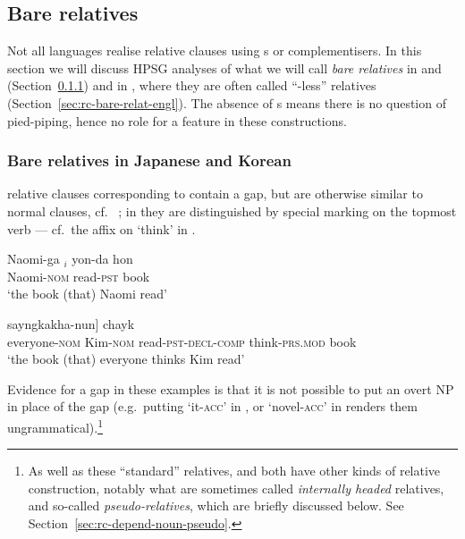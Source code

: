 \documentclass[output=paper
 	        ,biblatex
                ,babelshorthands
                ,newtxmath
                ,draftmode
                ,colorlinks, citecolor=brown
]{langscibook}
\begin{document}
\subsection{Bare relatives}
\label{sec:rc-bare-relatives}

Not all languages realise relative clauses using s or complementisers. In this section we
will discuss HPSG analyses of what we will call \emph{bare relatives} in  and 
(Section~\ref{sec:rc-bare-relat-japan}) and in , where they are often called
``-less'' relatives (Section~\ref{sec:rc-bare-relat-engl}).  The absence of s means there is no question of pied-piping, hence no role for a 
feature in these constructions.

\subsubsection{Bare relatives in Japanese and Korean}
\label{sec:rc-bare-relat-japan}

relative clauses corresponding to  contain a gap, but are otherwise similar to
normal clauses, cf.\  \citep[from][18]{SiraiGunjiRelative}; in  they are
distinguished by special marking on the topmost verb --- cf.\ the  affix on
 `think' in 
\citep[from][285]{Kim16SyntacticStrKorean}.
\begin{exe}\ex\label{x:rc-81}
\gll Naomi-ga \trace{}$_i$ yon-da hon\\
     Naomi-\textsc{nom} {} read-\textsc{pst} book\\
\glt `the book (that) Naomi read'
\end{exe}
\begin{exe}\ex\label{x:rc-82}
\gll [motwu-ka           [Kim-i       \trace{}\subscr{i} ilk-ess-ta-ko]  sayngkakha-nun] chayk \\
      \hphantom{[}everyone-\textsc{nom} \hphantom{[}Kim-\textsc{nom}  {}     read-\textsc{pst-decl-comp} think-\textsc{prs.mod}   book\\
\glt `the book (that) everyone thinks Kim read'  
\end{exe}
Evidence for a gap in these examples is that it is not possible to put an overt NP in
place of the gap (e.g.\ putting  `it-\textsc{acc}' in , or
 `novel-\textsc{acc}' in  renders them ungrammatical).\footnote{As
  well as these ``standard'' relatives,  and  both have other kinds of
  relative construction, notably what are sometimes called \emph{internally headed} relatives, and so-called
  \emph{pseudo-relatives}, which are briefly discussed below. See
  Section~\ref{sec:rc-depend-noun-pseudo}.}
\end{document}
